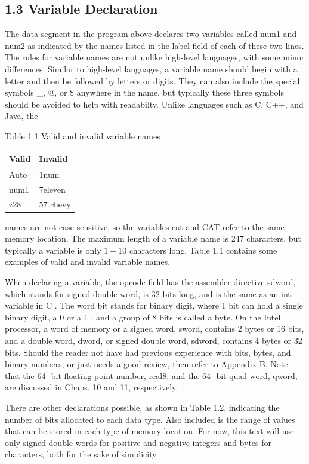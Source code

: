 \documentclass[10pt]{article}
\begin{document}
\subsection*{1.3 Variable Declaration}
The data segment in the program above declares two variables called num1 and num2 as indicated by the names listed in the label field of each of these two lines. The rules for variable names are not unlike high-level languages, with some minor differences. Similar to high-level languages, a variable name should begin with a letter and then be followed by letters or digits. They can also include the special symbols \_, @, or \$ anywhere in the name, but typically these three symbols should be avoided to help with readabilty. Unlike languages such as C, C++, and Java, the

Table 1.1 Valid and invalid variable names

\begin{center}
\begin{tabular}{|l|l|}
\hline
Valid & Invalid \\
\hline
Auto & 1num \\
\hline
num1 & 7eleven \\
\hline
z28 & 57 chevy \\
\hline
\end{tabular}
\end{center}

names are not case sensitive, so the variables cat and CAT refer to the same memory location. The maximum length of a variable name is 247 characters, but typically a variable is only $1-10$ characters long. Table 1.1 contains some examples of valid and invalid variable names.

When declaring a variable, the opcode field has the assembler directive sdword, which stands for signed double word, is 32 bits long, and is the same as an int variable in C . The word bit stands for binary digit, where 1 bit can hold a single binary digit, a 0 or a 1 , and a group of 8 bits is called a byte. On the Intel processor, a word of memory or a signed word, sword, contains 2 bytes or 16 bits, and a double word, dword, or signed double word, sdword, contains 4 bytes or 32 bits. Should the reader not have had previous experience with bits, bytes, and binary numbers, or just needs a good review, then refer to Appendix B. Note that the 64 -bit floating-point number, real8, and the 64 -bit quad word, qword, are discussed in Chaps. 10 and 11, respectively.

There are other declarations possible, as shown in Table 1.2, indicating the number of bits allocated to each data type. Also included is the range of values that can be stored in each type of memory location. For now, this text will use only signed double words for positive and negative integers and bytes for characters, both for the sake of simplicity.
\end{document}
